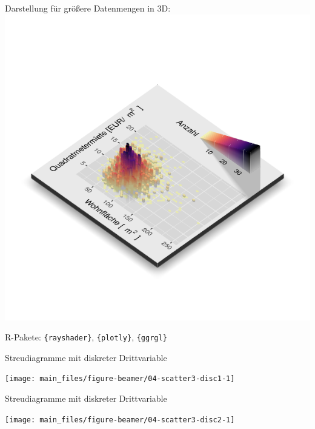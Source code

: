\documentclass[
  10pt,
  ignorenonframetext,
]{beamer}
\begin{document}
\begin{frame}[fragile]{Darstellung für größere Datenmengen}
\label{darstellung-fuxfcr-gruxf6uxdfere-datenmengen-2}
in 3D: \includegraphics{pics/04-miethex-3d.png}

\scriptsize

R-Pakete: \texttt{\{rayshader\}}, \texttt{\{plotly\}},
\texttt{\{ggrgl\}}

\scriptsize\normalsize
\end{frame}

\begin{frame}{Streudiagramme mit diskreter Drittvariable}
\label{streudiagramme-mit-diskreter-drittvariable}
\scriptsize

\begin{center}\texttt{[image: main\_files/figure-beamer/04-scatter3-disc1-1]} \end{center}

\normalsize
\end{frame}

\begin{frame}{Streudiagramme mit diskreter Drittvariable}
\label{streudiagramme-mit-diskreter-drittvariable-1}
\scriptsize

\begin{center}\texttt{[image: main\_files/figure-beamer/04-scatter3-disc2-1]} \end{center}

\normalsize
\end{frame}
\end{document}
